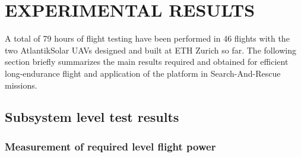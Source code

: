 \section{EXPERIMENTAL RESULTS}

A total of 79 hours of flight testing have been performed in 46 flights with the two AtlantikSolar UAVs designed and built at ETH Zurich so far. The following section briefly summarizes the main results required and obtained for efficient long-endurance flight and application of the platform in Search-And-Rescue missions.
 
\subsection{Subsystem level test results}
 
\subsubsection{Measurement of required level flight power} \label{secsec:LevelFlightPower}

